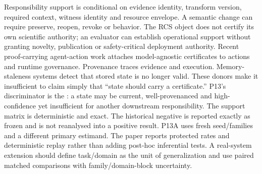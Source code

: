 \markdownRendererDocumentBegin
\markdownRendererSectionBegin
{}\markdownRendererInterblockSeparator
{}Responsibility support is conditional on evidence identity, transform version, required context, witness identity and resource envelope. A semantic change can require preserve, reopen, revoke or  behavior. The RCS object does not certify its own scientific authority; an evaluator can establish operational support without granting novelty, publication or safety-critical deployment authority.\markdownRendererInterblockSeparator
{}Recent proof-carrying agent-action work attaches model-agnostic certificates to actions and runtime governance. Provenance traces evidence and execution. Memory-staleness systems detect that stored state is no longer valid. These donors make it insufficient to claim simply that “state should carry a certificate.” P13's discriminator is the : a state may be current, well-provenanced and high-confidence yet insufficient for another downstream responsibility.\markdownRendererInterblockSeparator
{}The support matrix is deterministic and exact. The historical negative is reported exactly as frozen and is not reanalysed into a positive result. P13A uses fresh seed/families and a different primary estimand. The paper reports protected rates and deterministic replay rather than adding post-hoc inferential tests. A real-system extension should define task/domain as the unit of generalization and use paired matched comparisons with family/domain-block uncertainty.
\markdownRendererSectionEnd \markdownRendererDocumentEnd